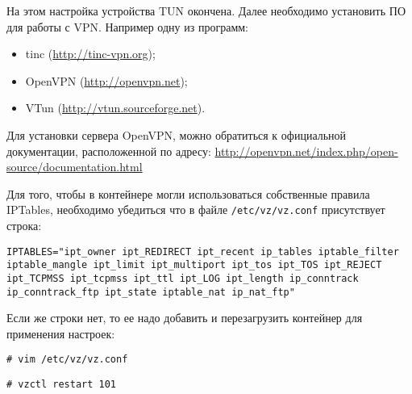 На этом настройка устройства TUN окончена.
Далее необходимо установить ПО для работы с VPN.
Например одну из программ:
\begin{itemize}
    \item tinc (\url{http://tinc-vpn.org});
    \item OpenVPN (\url{http://openvpn.net});
    \item VTun (\url{http://vtun.sourceforge.net}).
\end{itemize}

Для установки сервера OpenVPN, можно обратиться к официальной документации, расположенной по адресу: \url{http://openvpn.net/index.php/open-source/documentation.html}

Для того, чтобы в контейнере могли использоваться собственные правила IPTables, необходимо убедиться что в файле \texttt{/etc/vz/vz.conf} присутствует строка:
\begin{lstlisting}
IPTABLES="ipt_owner ipt_REDIRECT ipt_recent ip_tables iptable_filter iptable_mangle ipt_limit ipt_multiport ipt_tos ipt_TOS ipt_REJECT ipt_TCPMSS ipt_tcpmss ipt_ttl ipt_LOG ipt_length ip_conntrack ip_conntrack_ftp ipt_state iptable_nat ip_nat_ftp"
\end{lstlisting}

Если же строки нет, то ее надо добавить и перезагрузить контейнер для применения настроек:
\begin{lstlisting}
# vim /etc/vz/vz.conf
\end{lstlisting}
\begin{lstlisting}
# vzctl restart 101
\end{lstlisting}

\clearpage
